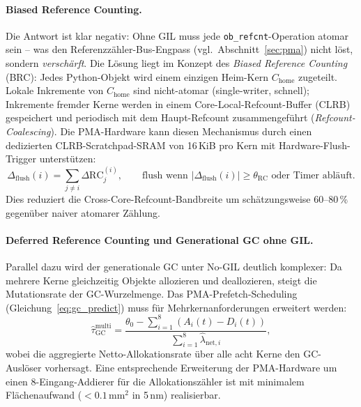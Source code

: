 ﻿\documentclass[a4paper,12pt]{scrreprt}
\theoremstyle{definition}
\begin{document}
	\paragraph{Biased Reference Counting.}
	Die Antwort ist klar negativ: Ohne GIL muss jede \texttt{ob\_refcnt}-Operation
	atomar sein -- was den Referenzzähler-Bus-Engpass (vgl.\ Abschnitt~\ref{sec:pma})
	nicht löst, sondern\emph{ verschärft}. Die Lösung liegt im Konzept des
	\emph{Biased Reference Counting} (BRC): Jedes Python-Objekt wird einem
	einzigen Heim-Kern $C_{\mathrm{home}}$ zugeteilt. Lokale Inkremente von
	$C_{\mathrm{home}}$ sind nicht-atomar (single-writer, schnell); Inkremente
	fremder Kerne werden in einem Core-Local-Refcount-Buffer (CLRB) gespeichert
	und periodisch mit dem Haupt-Refcount zusammengeführt (\emph{Refcount-Coalescing}).
	Die PMA-Hardware kann diesen Mechanismus durch einen dedizierten
	CLRB-Scratchpad-SRAM von 16\,KiB pro Kern mit Hardware-Flush-Trigger unterstützen:
	\begin{equation}
		\Delta_{\mathrm{flush}}(i) = \sum_{j \ne i} \Delta \mathrm{RC}_j^{(i)},
		\qquad
		\text{flush wenn } |\Delta_{\mathrm{flush}}(i)| \ge \theta_{\mathrm{RC}}
		\text{ oder Timer abläuft.}
		\label{eq:brc_flush}
	\end{equation}
	Dies reduziert die Cross-Core-Refcount-Bandbreite um schätzungsweise 60--80\,\%
	gegenüber naiver atomarer Zählung.

	\paragraph{Deferred Reference Counting und Generational GC ohne GIL.}
	Parallel dazu wird der generationale GC unter No-GIL deutlich komplexer:
	Da mehrere Kerne gleichzeitig Objekte allozieren und deallozieren, steigt
	die Mutationsrate der GC-Wurzelmenge. Das PMA-Prefetch-Scheduling
	(Gleichung~\eqref{eq:gc_predict}) muss für Mehrkernanforderungen erweitert werden:
	\begin{equation}
		\hat\tau_{\mathrm{GC}}^{\mathrm{multi}} =
		\frac{\theta_0 - \sum_{i=1}^{8} (A_i(t) - D_i(t))}
		{\sum_{i=1}^{8} \hat\lambda_{\mathrm{net},i}},
		\label{eq:gc_predict_multi}
	\end{equation}
	wobei die aggregierte Netto-Allokationsrate über alle acht Kerne den
	GC-Auslöser vorhersagt. Eine entsprechende Erweiterung der PMA-Hardware um
	einen 8-Eingang-Addierer für die Allokationszähler ist mit minimalem
	Flächenaufwand ($<\!0.1\,\mathrm{mm}^2$ in 5\,nm) realisierbar.
\end{document}
